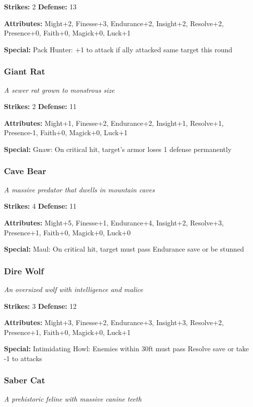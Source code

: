 \documentclass[10pt,twoside]{article}
\begin{document}
\textbf{Strikes:} 2 \quad \textbf{Defense:} 13

\textbf{Attributes:} Might+2, Finesse+3, Endurance+2, Insight+2, Resolve+2, Presence+0, Faith+0, Magick+0, Luck+1

\textbf{Special:} Pack Hunter: +1 to attack if ally attacked same target this round

\subsubsection{Giant Rat}
\textit{A sewer rat grown to monstrous size}

\textbf{Strikes:} 2 \quad \textbf{Defense:} 11

\textbf{Attributes:} Might+1, Finesse+2, Endurance+2, Insight+1, Resolve+1, Presence-1, Faith+0, Magick+0, Luck+1

\textbf{Special:} Gnaw: On critical hit, target's armor loses 1 defense permanently

\subsubsection{Cave Bear}
\textit{A massive predator that dwells in mountain caves}

\textbf{Strikes:} 4 \quad \textbf{Defense:} 11

\textbf{Attributes:} Might+5, Finesse+1, Endurance+4, Insight+2, Resolve+3, Presence+1, Faith+0, Magick+0, Luck+0

\textbf{Special:} Maul: On critical hit, target must pass Endurance save or be stunned

\subsubsection{Dire Wolf}
\textit{An oversized wolf with intelligence and malice}

\textbf{Strikes:} 3 \quad \textbf{Defense:} 12

\textbf{Attributes:} Might+3, Finesse+2, Endurance+3, Insight+3, Resolve+2, Presence+1, Faith+0, Magick+0, Luck+1

\textbf{Special:} Intimidating Howl: Enemies within 30ft must pass Resolve save or take -1 to attacks

\subsubsection{Saber Cat}
\textit{A prehistoric feline with massive canine teeth}
\end{document}
